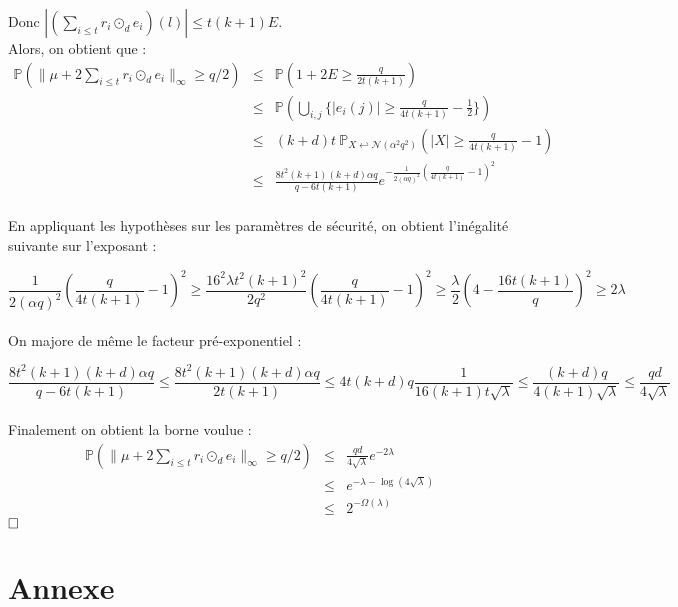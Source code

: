 \documentclass[11pt,a4paper]{article}
\begin{document}
Donc $|(\sum_{i \leq t}r_i \odot_d e_i)(l)|\leq t(k+1)E$. \\

Alors, on obtient que : 
\begin{eqnarray*}
\mathbb{P}(\|\mu + 2\sum_{i \leq t}r_i \odot_d e_i  \|_\infty \geq q/2 ) &\leq& \mathbb{P}(1+2E \geq \frac{q}{2t(k+1)}) \\
&\leq& \mathbb{P}(\bigcup_{i,j} \{ |e_i(j)| \geq \frac{q}{4t(k+1)} - \frac{1}{2} \} ) \\
&\leq& (k+d)t \ \mathbb{P}_{X \hookleftarrow \mathcal{N}(\alpha^2 q^2)}(|X| \geq \frac{q}{4t(k+1)} - 1) \\
&\leq& \frac{8t^2(k+1)(k+d)\alpha q}{q - 6t(k+1)} e^{-\frac{1}{2(\alpha q)^2}(\frac{q}{4t(k+1)}-1)^2} \\
\end{eqnarray*}

En appliquant les hypothèses sur les paramètres de sécurité, on obtient l'inégalité suivante sur l'exposant :

\[
\frac{1}{2(\alpha q)^2}(\frac{q}{4t(k+1)}-1)^2 \geq \frac{16^2\lambda t^2(k+1)^2}{2q^2}(\frac{q}{4t(k+1)}-1)^2 
\geq \frac{\lambda}{2}(4-\frac{16t(k+1)}{q})^2
\geq 2\lambda
\]
\\

On majore de même le facteur pré-exponentiel : 

\[
\frac{8t^2(k+1)(k+d)\alpha q}{q - 6t(k+1)} \leq \frac{8t^2(k+1)(k+d)\alpha q}{2t(k+1)}
\leq 4t(k+d)q\frac{1}{16(k+1)t\sqrt{\lambda}} 
\leq \frac{(k+d)q}{4(k+1)\sqrt{\lambda}}
\leq \frac{qd}{4\sqrt{\lambda}}
\]
\\

Finalement on obtient la borne voulue :
\begin{eqnarray*}
\mathbb{P}(\|\mu + 2\sum_{i \leq t}r_i \odot_d e_i  \|_\infty \geq q/2 ) &\leq&  \frac{qd}{4\sqrt{\lambda}}e^{-2\lambda} \\
&\leq& e^{-\lambda-\log(4\sqrt{\lambda})} \\
&\leq& 2^{-\Omega(\lambda)}
\end{eqnarray*}
$\hfill \square$

\section*{Annexe}
\printbibliography[heading=bibintoc, title={Références}]
\end{document}
